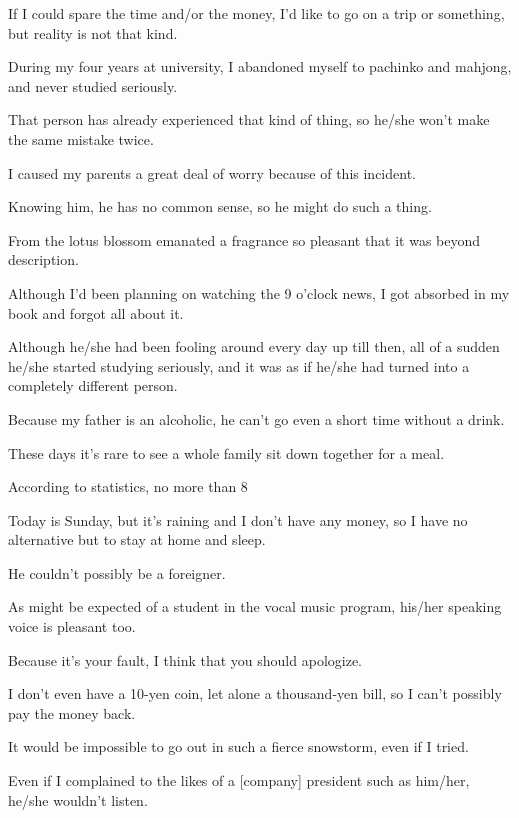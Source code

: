 \item[85.] If I could spare the time and/or the money, I'd like to go on a trip or something, but reality is not that kind.
\item[86.] During my four years at university, I abandoned myself to pachinko and mahjong, and never studied seriously.
\item[87.] That person has already experienced that kind of thing, so he/she won't make the same mistake twice.
\item[88.] I caused my parents a great deal of worry because of this incident.
\item[89.] Knowing him, he has no common sense, so he might do such a thing.
\item[90.] From the lotus blossom emanated a fragrance so pleasant that it was beyond description.
\item[91.] Although I'd been planning on watching the 9 o'clock news, I got absorbed in my book and forgot all about it.
\item[92.] Although he/she had been fooling around every day up till then, all of a sudden he/she started studying seriously, and it was as if he/she had turned into a completely different person.
\item[93.] Because my father is an alcoholic, he can't go even a short time without a drink.
\item[94.] These days it's rare to see a whole family sit down together for a meal.
\item[95.] According to statistics, no more than 8%
\item[96.] Today is Sunday, but it's raining and I don't have any money, so I have no alternative but to stay at home and sleep.
\item[97.] He couldn't possibly be a foreigner.
\item[98.] As might be expected of a student in the vocal music program, his/her speaking voice is pleasant too.
\item[99.] Because it's your fault, I think that you should apologize.
\item[100.] I don't even have a 10-yen coin, let alone a thousand-yen bill, so I can't possibly pay the money back.
\fi
\ifVOLTWO
\item[101.] It would be impossible to go out in such a fierce snowstorm, even if I tried.
\item[102.] Even if I complained to the likes of a [company] president such as him/her, he/she wouldn't listen.
